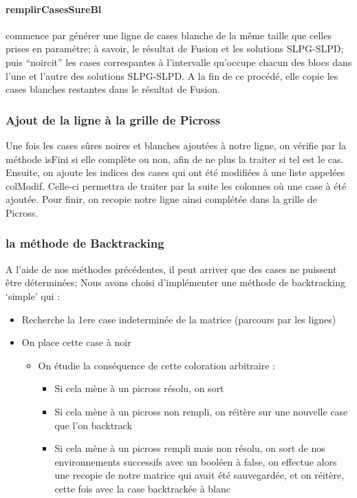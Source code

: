 \documentclass{article}
\begin{document}
\paragraph{remplirCasesSureBl} commence par générer une ligne de cases blanche de la même taille que celles prises en paramétre; à savoir, le résultat de Fusion et les solutions SLPG-SLPD; puis ``noircit'' les cases correspantes à l'intervalle qu'occupe chacun des blocs dans l'une et l'autre des solutions SLPG-SLPD.
\newline
A la fin de ce procédé, elle copie les cases blanches restantes dans le résultat de Fusion.
\subsubsection{Ajout de la ligne à la grille de Picross}
Une fois les cases sûres noires et blanches ajoutées à notre ligne, on vérifie par la méthode isFini si elle complète ou non, afin de ne plus la traiter si tel est le cas.
\newline
Ensuite, on ajoute les indices des cases qui ont été modifiées à une liste appelées colModif. Celle-ci permettra de traiter par la suite les colonnes où une case à été ajoutée.
\newline
Pour finir, on recopie notre ligne ainsi complétée dans la grille de Picross.

\subsubsection{la méthode de Backtracking}
A l'aide de nos méthodes précédentes, il peut arriver que des cases ne puissent être déterminées;\newline
Nous avons choisi d'implémenter une méthode de backtracking `simple' qui : 
\begin{itemize}
\item Recherche la 1ere case indeterminée de la matrice (parcours par les lignes)
\item On place cette case à noir
\begin{itemize}
\item On étudie la conséquence de cette coloration arbitraire : 
\begin{itemize}
\item Si cela mène à un picross résolu, on sort
\item Si cela mène à un picross non rempli, on réitère sur une nouvelle case que l'on backtrack
\item Si cela mène à un picross rempli mais non résolu, on sort de nos environnements successifs avec un booléen à false, on effectue alors une recopie de notre matrice qui avait été sauvegardée, et on réitère, cette fois avec la case backtrackée à blanc
\end{itemize}
\end{itemize}
\end{itemize}
\end{document}
